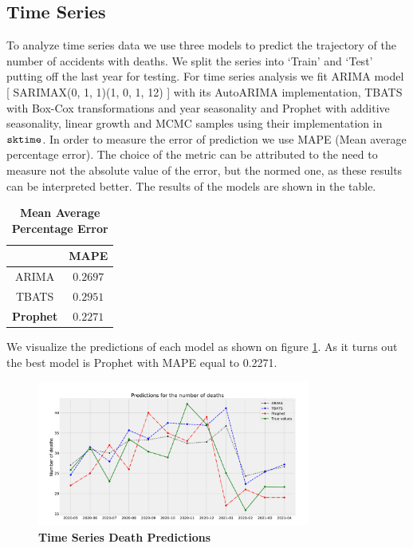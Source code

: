 \subsection{Time Series}

To analyze time series data we use three models to predict the trajectory of the number of accidents with deaths.
We split the series into ‘Train’ and ‘Test’ putting off the last year for testing.
For time series analysis we fit ARIMA model [ SARIMAX(0, 1, 1)(1, 0, 1, 12) ] with its AutoARIMA implementation,
TBATS with Box-Cox transformations and year seasonality and Prophet \cite{prophet} with additive seasonality,
linear growth and MCMC samples using their implementation in $\verb|sktime|$.
In order to measure the error of prediction we use MAPE (Mean average percentage error).
The choice of the metric can be attributed to the need to measure not the absolute value of the error, but the normed one,
as these results can be interpreted better. The results of the models are shown in the table. \\

\begin{table}[htpb]
	\centering
	\label{tab:mape}
	\begin{tabular}{|c|c|}
		\hline
		& MAPE \\
		\hline
		ARIMA & $0.2697$ \\
		TBATS	& $0.2951$ \\
		\textbf{Prophet}	& $0.2271$ \\ 
		\hline
	\end{tabular}
	\caption{\textbf{Mean Average Percentage Error}}
\end{table}
\noindent
We visualize the predictions of each model as shown on figure \ref{fig:ts_predictions}.
As it turns out the best model is Prophet with MAPE equal to 0.2271.
\begin{figure}[htpb!]
	\centering
	\includegraphics[width=0.8\textwidth]{../imgs/pdf_files/ts_predictions.pdf}
	\caption{\textbf{Time Series Death Predictions}}
	\label{fig:ts_predictions}
\end{figure}
